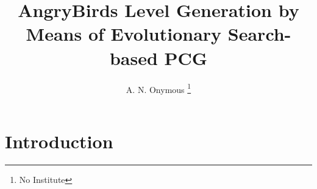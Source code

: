 \documentclass[runningheads,a4paper]{llncs}
\newcommand{\keywords}[1]{\par\addvspace\baselineskip
	\noindent\keywordname\enspace\ignorespaces#1}
\begin{document}
\mainmatter  %

\title{AngryBirds Level Generation by Means of Evolutionary Search-based PCG}



%
%

\author{A. N. Onymous%
\thanks{No Institute}}



%
%

\maketitle

%
%
\begin{abstract}

\end{abstract}

%
%
\section{Introduction}
\label{sec:intro}
%
%

\end{document}
